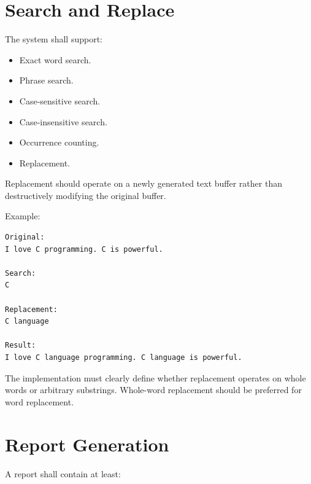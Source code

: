 \documentclass[12pt,a4paper]{article}
\begin{document}

\section{Search and Replace}

The system shall support:

\begin{itemize}
    \item Exact word search.
    \item Phrase search.
    \item Case-sensitive search.
    \item Case-insensitive search.
    \item Occurrence counting.
    \item Replacement.
\end{itemize}

Replacement should operate on a newly generated text buffer rather
than destructively modifying the original buffer.

Example:

\begin{verbatim}
Original:
I love C programming. C is powerful.

Search:
C

Replacement:
C language

Result:
I love C language programming. C language is powerful.
\end{verbatim}

The implementation must clearly define whether replacement operates on
whole words or arbitrary substrings. Whole-word replacement should be
preferred for word replacement.


\section{Report Generation}

A report shall contain at least:
\end{document}

